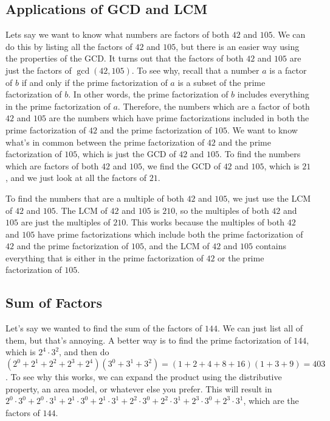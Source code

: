 \documentclass{article}
\begin{document}
\begin{multicols}{2}
	\subsection*{Applications of GCD and LCM}
	Lets say we want to know what numbers are factors of both $42$ and $105$.
	We can do this by listing all the factors of $42$ and $105$, but there is an easier way using
	the properties of the GCD.
	It turns out that the factors of both $42$ and $105$ are just the factors of $\gcd(42, 105)$.
	To see why, recall that a number $a$ is a factor of $b$ if and only if the
	prime factorization of $a$ is a subset of the prime factorization of $b$.
	In other words, the prime factorization of $b$ includes everything in the prime factorization of
	$a$.
	Therefore, the numbers which are a factor of both $42$ and $105$ are the numbers which have
	prime factorizations included in both the prime factorization of $42$ and the
	prime factorization of $105$.
	We want to know what's in common between the prime factorization of $42$ and the prime
	factorization of $105$, which is just the GCD of $42$ and $105$.
	To find the numbers which are factors of both $42$ and $105$, we find the GCD of $42$ and $105$,
	which is $21$, and we just look at all the factors of $21$.

	To find the numbers that are a multiple of both $42$ and $105$, we just use the LCM of $42$
	and $105$.
	The LCM of $42$ and $105$ is $210$, so the multiples of both $42$ and $105$ are just
	the multiples of $210$.
	This works because the multiples of both $42$ and $105$ have prime factorizations which
	include both the prime factorization of $42$ and the prime factorization of $105$, and the
	LCM of $42$ and $105$ contains everything that is either in the prime factorization of $42$
	or the prime factorization of $105$.
	
	\subsection*{Sum of Factors}
	Let's say we wanted to find the sum of the factors of $144$.
	We can just list all of them, but that's annoying.
	A better way is to find the prime factorization of $144$, which is $2^4 \cdot 3^2$,
	and then do $(2^0 + 2^1 + 2^2 + 2^3 + 2^4)(3^0 + 3^1 + 3^2)
	= (1 + 2 + 4 + 8 + 16)(1 + 3 + 9) = 403$.
	To see why this works, we can expand the product using the distributive property,
	an area model, or whatever else you prefer.
	This will result in $2^0 \cdot 3^0 + 2^0 \cdot 3^1 + 2^1 \cdot 3^0 + 2^1 \cdot 3^1
	+ 2^2 \cdot 3^0 + 2^2 \cdot 3^1 + 2^3 \cdot 3^0 + 2^3 \cdot 3^1$,
	which are the factors of $144$.
	

\end{multicols}
\end{document}
